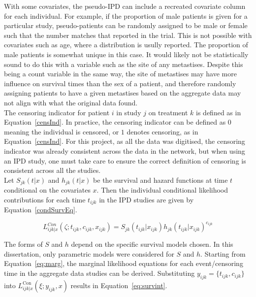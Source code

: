 With some covariates, the pseudo-IPD can include a recreated covariate column for each individual. For example, if the proportion of male patients is given for a particular study, pseudo-patients can be randomly assigned to be male or female such that the number matches that reported in the trial. This is not possible with covariates such as age, where a distribution is usully reported. The proportion of male patients is somewhat unique in this case. It would likely not be statistically sound to do this with a variable such as the site of any metastises. Despite this being a count variable in the same way, the site of metastises may have more influence on survival times than the sex of a patient, and therefore randomly assigning patients to have a given metastises based on the aggregate data may not align with what the original data found. \\ 

The censoring indicator for patient $i$ in study $j$ on treatment $k$ is defined as in Equation~\ref{censInd}. In practice, the censoring indicator can be defined as $0$ meaning the individual is censored, or $1$ denotes censoring, as in Equation~\ref{censInd}. For this project, as all the data was digitised, the censoring indicator was already consistent across the data in the network, but when using an IPD study, one must take care to ensure the correct definition of censoring is consistent across all the studies. \\ 

Let $S_{jk}(t|x)$ and $h_{jk}(t|x)$ be the survival and hazard functions at time $t$ conditional on the covariates $x$. Then the individual conditional likelihood contributions for each time $t_{ijk}$ in the IPD studies are given by Equation~\ref{condSurvEq}. 

\begin{equation}
    L_{ijk|x}^{Con}(\zeta;t_{ijk},c_{ijk},x_{ijk}) = S_{jk}(t_{ijk}| x_{ijk})h_{jk}(t_{ijk}|x_{ijk})^{c_{ijk}}
    \label{condSurvEq}
\end{equation}

The forms of $S$ and $h$ depend on the specific survival models chosen. In this dissertation, only parametric models were considered for $S$ and $h$. Starting from Equation~\ref{eq:marg}, the marginal likelihood equations for each event/censoring time in the aggregate data studies can be derived. Substituting $y_{ijk} = \{t_{ijk}, c_{ijk}\}$ into $L_{ijk|x}^{\text{Con}}(\xi; y_{ijk}, x)$ results in Equation~\ref{eq:survint}.

